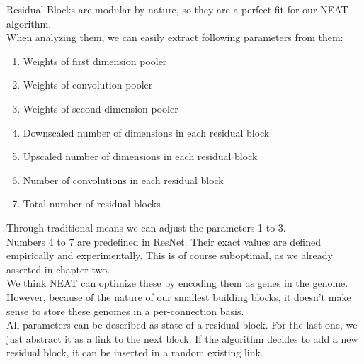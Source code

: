 Residual Blocks are modular by nature, so they are a perfect fit for our NEAT algorithm.\\
When analyzing them, we can easily extract following parameters from them:\\
\begin{enumerate}
	\item{Weights of first dimension pooler}
	\item{Weights of convolution pooler}
	\item{Weights of second dimension pooler}
	\item{Downscaled number of dimensions in each residual block}
	\item{Upscaled number of dimensions in each residual block}
	\item{Number of convolutions in each residual block}
	\item{Total number of residual blocks}
\end{enumerate}  
Through traditional means we can adjust the parameters 1 to 3. \\
Numbers 4 to 7 are predefined in ResNet. 
Their exact values are defined empirically and experimentally. This is of course suboptimal, as we already asserted in chapter two.\\
We think NEAT can optimize these by encoding them as genes in the genome. \\
However, because of the nature of our smallest building blocks, it doesn't make sense to store these genomes in a per-connection basis.\\
All parameters can be described as state of a residual block. For the last one, we just abstract it as a link to the next block. If the algorithm decides to add a new residual block, it can be inserted in a random existing link.\\
